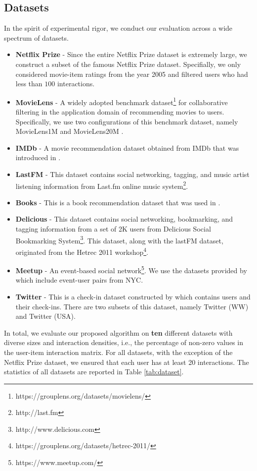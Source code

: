 \documentclass[sigconf]{acmart}
\begin{document}
\subsection{Datasets}



In the spirit of experimental rigor, we conduct our evaluation across a wide spectrum of datasets. 




\begin{itemize}
\item \textbf{Netflix Prize} - Since the entire Netflix Prize dataset is extremely large, we construct a subset of the famous Netflix Prize dataset. Specifially, we only considered movie-item ratings from the year 2005 and filtered users who had less than $100$ interactions. 
\item \textbf{MovieLens} - A widely adopted benchmark dataset\footnote{https://grouplens.org/datasets/movielens/} for collaborative filtering in the application domain of recommending movies to users. Specifically, we use two configurations of this benchmark dataset, namely MovieLens1M and MovieLens20M \cite{DBLP:journals/tiis/HarperK16}. 
\item \textbf{IMDb} - A movie recommendation dataset obtained from IMDb that was introduced in \cite{DBLP:conf/kdd/DiaoQWSJW14}.
\item \textbf{LastFM} - This dataset contains social networking, tagging, and music artist listening information 
    from Last.fm online music system\footnote{http://last.fm}. 
\item \textbf{Books} - This is a book recommendation dataset that was used in \cite{DBLP:conf/www/ZieglerMKL05}. 
\item \textbf{Delicious} - This dataset contains social networking, bookmarking, and tagging information 
    from a set of 2K users from Delicious Social Bookmarking System\footnote{http://www.delicious.com}. This dataset, along with the lastFM dataset, originated from the Hetrec 2011 workshop\footnote{https://grouplens.org/datasets/hetrec-2011/}.
\item \textbf{Meetup} - An event-based social network\footnote{https://www.meetup.com/}. We use the datasets provided by \cite{DBLP:conf/icde/PhamLCZ15} which include event-user pairs from NYC.
\item \textbf{Twitter} - This is a check-in dataset constructed by \cite{DBLP:conf/kdd/YuanCMSM13} which contains users and their check-ins. There are two subsets of this dataset, namely Twitter (WW) and Twitter (USA).  
\end{itemize}
In total, we evaluate our proposed algorithm on \textbf{ten} different datasets with diverse sizes and interaction densities, i.e., the percentage of non-zero values in the user-item interaction matrix. For all datasets, with the exception of the Netflix Prize dataset, we ensured that each user has at least 20 interactions. The statistics of all datasets are reported in Table \ref{tab:dataset}.
\end{document}
